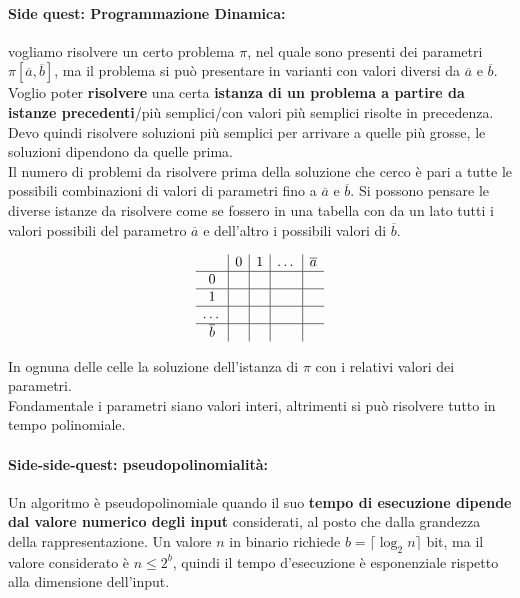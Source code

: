 \newpage

\paragraph{Side quest: Programmazione Dinamica:} vogliamo risolvere un certo problema $\pi$, nel quale sono presenti dei parametri $\pi [\overline{a},\overline{b}]$, ma il problema si può presentare in varianti con valori diversi da $\overline{a}$ e $\overline{b}$.\\

Voglio poter \textbf{risolvere} una certa \textbf{istanza di un problema a partire da istanze precedenti}/più semplici/con valori più semplici risolte in precedenza.\\
Devo quindi risolvere soluzioni più semplici per arrivare a quelle più grosse, le soluzioni dipendono da quelle prima.\\

Il numero di problemi da risolvere prima della soluzione che cerco è pari a tutte le possibili combinazioni di valori di parametri fino a $\overline{a}$ e $\overline{b}$. Si possono pensare le diverse istanze da risolvere come se fossero in una tabella con da un lato tutti i valori possibili del parametro $\overline{a}$ e dell'altro i possibili valori di $\overline{b}$.

$$
\begin{array}{c | c | c | c | c }
	& 0 & 1 & \dots & \overline{a} \\
	\hline
	0 & & & & \\
	\hline
	1 & & & & \\
	\hline
	\dots & & & & \\
	\hline
	\overline{b} & & & &
\end{array}
$$

In ognuna delle celle la soluzione dell'istanza di $\pi$ con i relativi valori dei parametri.\\

Fondamentale i parametri siano valori interi, altrimenti si può risolvere tutto in tempo polinomiale.\\

\paragraph{Side-side-quest: pseudopolinomialità:} Un algoritmo è pseudopolinomiale quando il suo \textbf{tempo di esecuzione dipende dal valore numerico degli input} considerati, al posto che dalla grandezza della rappresentazione. Un valore $n$ in binario richiede $b = \lceil \log_2 n \rceil$ bit, ma il valore considerato è $n \leq 2^b$, quindi il tempo d'esecuzione è esponenziale rispetto alla dimensione dell'input.\\

